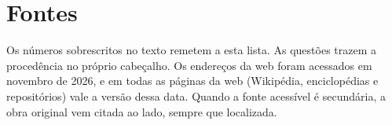 \chapter*{Fontes}
\small
Os números sobrescritos no texto remetem a esta lista. As questões trazem a procedência no próprio cabeçalho. Os endereços da web foram acessados em novembro de 2026, e em todas as páginas da web (Wikipédia, enciclopédias e repositórios) vale a versão dessa data. Quando a fonte acessível é secundária, a obra original vem citada ao lado, sempre que localizada.

